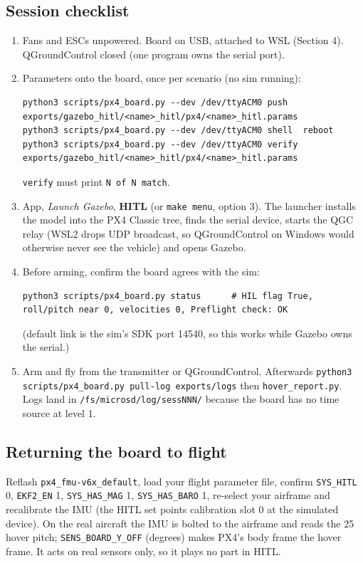 \documentclass[11pt,a4paper]{article}
\newcommand{\file}[1]{\texttt{#1}}
\newcommand{\param}[1]{\texttt{#1}}
\begin{document}
\subsection{Session checklist}
\begin{enumerate}[leftmargin=*]
  \item Fans and ESCs unpowered. Board on USB, attached to WSL (Section 4). QGroundControl closed
        (one program owns the serial port).
  \item Parameters onto the board, once per scenario (no sim running):
\begin{lstlisting}
python3 scripts/px4_board.py --dev /dev/ttyACM0 push   exports/gazebo_hitl/<name>_hitl/px4/<name>_hitl.params
python3 scripts/px4_board.py --dev /dev/ttyACM0 shell  reboot
python3 scripts/px4_board.py --dev /dev/ttyACM0 verify exports/gazebo_hitl/<name>_hitl/px4/<name>_hitl.params
\end{lstlisting}
        \file{verify} must print \texttt{N of N match}.
  \item App, \emph{Launch Gazebo}, \textbf{HITL} (or \file{make menu}, option 3). The launcher
        installs the model into the PX4 Classic tree, finds the serial device, starts the QGC
        relay (WSL2 drops UDP broadcast, so QGroundControl on Windows would otherwise never see
        the vehicle) and opens Gazebo.
  \item Before arming, confirm the board agrees with the sim:
\begin{lstlisting}
python3 scripts/px4_board.py status      # HIL flag True, roll/pitch near 0, velocities 0, Preflight check: OK
\end{lstlisting}
        (default link is the sim's SDK port 14540, so this works while Gazebo owns the serial.)
  \item Arm and fly from the transmitter or QGroundControl. Afterwards
        \file{python3 scripts/px4\_board.py pull-log exports/logs} then \file{hover\_report.py}.
        Logs land in \file{/fs/microsd/log/sessNNN/} because the board has no time source at level 1.
\end{enumerate}

\subsection{Returning the board to flight}
Reflash \file{px4\_fmu-v6x\_default}, load your flight parameter file, confirm \param{SYS\_HITL} 0,
\param{EKF2\_EN} 1, \param{SYS\_HAS\_MAG} 1, \param{SYS\_HAS\_BARO} 1, re-select your airframe
and recalibrate the IMU (the HITL set points calibration slot 0 at the simulated device).
On the real aircraft the IMU is bolted to the airframe and reads the 25\textdegree{} hover pitch;
\param{SENS\_BOARD\_Y\_OFF} (degrees) makes PX4's body frame the hover frame. It acts on real
sensors only, so it plays no part in HITL.
\end{document}
